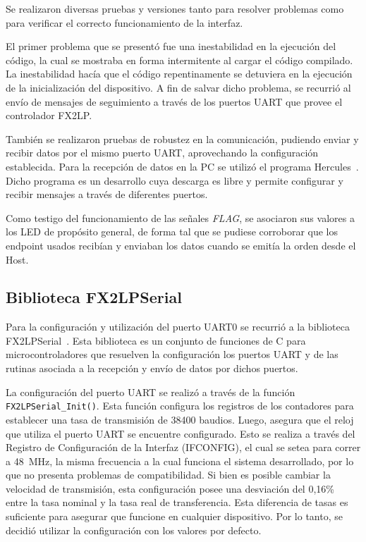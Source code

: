 
Se realizaron diversas pruebas y versiones tanto para resolver problemas como para verificar el correcto funcionamiento de la interfaz.

El primer problema que se presentó fue una inestabilidad en la ejecución del código, la cual se mostraba en forma intermitente al cargar el código compilado. La inestabilidad hacía que el código repentinamente se detuviera en la ejecución de la inicialización del dispositivo. A fin de salvar dicho problema, se recurrió al envío de mensajes de seguimiento a través de los puertos UART que provee el controlador FX2LP.

También se realizaron pruebas de robustez en la comunicación, pudiendo enviar y recibir datos por el mismo puerto UART, aprovechando la configuración establecida. Para la recepción de datos en la PC se utilizó el programa Hercules~\cite{HWGroup}. Dicho programa es un desarrollo cuya descarga es libre y permite configurar y recibir mensajes a través de diferentes puertos.

Como testigo del funcionamiento de las señales \textit{FLAG}, se asociaron sus valores a los LED de propósito general, de forma tal que se pudiese corroborar que los endpoint usados recibían y enviaban los datos cuando se emitía la orden desde el Host.

\subsection{Biblioteca FX2LPSerial}
Para la configuración y utilización del puerto UART0 se recurrió a la biblioteca FX2LPSerial~\cite{Kumar2017}. Esta biblioteca es un conjunto de funciones de C para microcontroladores que resuelven la configuración los puertos UART y de las rutinas asociada a la recepción y envío de datos por dichos puertos. 

La configuración del puerto UART se realizó a través de la función \verb|FX2LPSerial_Init()|. Esta función configura los registros de los contadores para establecer una tasa de transmisión de 38400 baudios. Luego, asegura que el reloj que utiliza el puerto UART se encuentre configurado. Esto se realiza a través del Registro de Configuración de la Interfaz (IFCONFIG), el cual se setea para correr a \SI{48}{\mega\hertz}, la misma frecuencia a la cual funciona el sistema desarrollado, por lo que no presenta problemas de compatibilidad. Si bien es posible cambiar la velocidad de transmisión, esta configuración posee una desviación del 0,16\%~\cite{CypressSemiconductor2014fx2lp} entre la tasa nominal y la tasa real de transferencia. Esta diferencia de tasas es suficiente para asegurar que funcione en cualquier dispositivo. Por lo tanto, se decidió utilizar la configuración con los valores por defecto.

